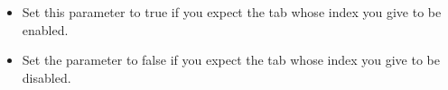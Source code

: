 \begin{itemize}
\item Set this parameter to true if you expect the tab whose index you give to be enabled.
\item Set the parameter to false if you expect the tab whose index you give to be disabled. 
\end{itemize}
    
